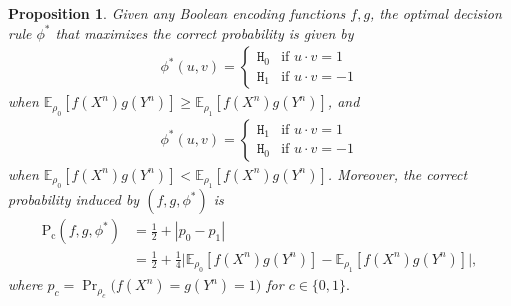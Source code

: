 \documentclass[journal,draftcls, onecolumn]{IEEEtran}
\newtheorem{proposition}{Proposition}
\newcommand{\rom}[1]{\mathrm{#1}}
\newcommand{\Pc}{\rom{P}_{\rom{c}}}
\begin{document}
\begin{proposition}\label{prop:decisionrule}
Given any Boolean encoding functions $f,g$, the optimal decision rule $\phi^*$ that maximizes the correct probability is given by 
\begin{align}
\phi^*(u,v) = \left\{
\begin{array}{ll}
\mathtt{H}_0 & \mbox{if } u\cdot v = 1 \\
\mathtt{H}_1 & \mbox{if } u \cdot v = -1
\end{array}
\right. \label{eq:Bayesian-decision-OPT1}
\end{align}
when $\mathbb{E}_{\rho_{0}}[f(X^{n})g(Y^{n})]\ge \mathbb{E}_{\rho_{1}}[f(X^{n})g(Y^{n})]$, and
\begin{align}
\phi^*(u,v) = \left\{
\begin{array}{ll}
\mathtt{H}_1 & \mbox{if } u\cdot v = 1 \\
\mathtt{H}_0 & \mbox{if } u \cdot v = -1
\end{array}
\right. \label{eq:Bayesian-decision-OPT2}
\end{align}
when $\mathbb{E}_{\rho_{0}}[f(X^{n})g(Y^{n})] < \mathbb{E}_{\rho_{1}}[f(X^{n})g(Y^{n})]$. 
Moreover, the correct probability induced by $(f,g,\phi^*)$ is 
\begin{align}  
\Pc(f,g,\phi^*) & = \frac{1}{2} + |p_0 - p_1 | \\
& = \frac{1}{2} + \frac{1}{4} \big|\mathbb{E}_{\rho_{0}}[f(X^{n})g(Y^{n})]-\mathbb{E}_{\rho_{1}}[f(X^{n})g(Y^{n})]\big|,\label{eq:Pc-OPT}
\end{align}
where $p_c= \Pr_{\rho_c}\big( f(X^n)= g(Y^n)= 1 \big)$ for $c \in \{0,1\}.$
\end{proposition}
\end{document}
